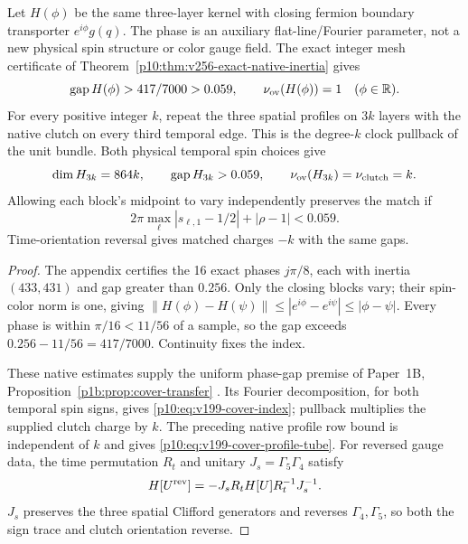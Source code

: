 \documentclass[12pt,a4paper]{article}
\begin{document}
\begin{theorem}
\label{p10:thm:v199-native-clock-covers}
Let \(H(\phi)\) be the same three-layer kernel with closing fermion boundary
transporter \(e^{i\phi}g(q)\).  The phase is an auxiliary flat-line/Fourier
parameter, not a new physical spin structure or color gauge field. The exact
integer mesh certificate of Theorem~\ref{p10:thm:v256-exact-native-inertia} gives
\begin{equation}
 \operatorname{gap}H(\phi)>417/7000>0.059,\qquad
 \nu_{\rm ov}(H(\phi))=1\quad(\phi\in\mathbb R).
 \label{p10:eq:v199-uniform-twist-gap}
\end{equation}
For every positive integer \(k\), repeat the three spatial profiles on
\(3k\) layers with the native clutch on every third temporal edge.  This is
the degree-\(k\) clock pullback of the unit bundle.  Both physical temporal
spin choices give
\begin{equation}
 \dim H_{3k}=864k,\qquad \operatorname{gap}H_{3k}>0.059,\qquad
 \nu_{\rm ov}(H_{3k})=\nu_{\rm clutch}=k.
 \label{p10:eq:v199-cover-index}
\end{equation}
Allowing each block's midpoint to vary independently preserves the match if
\begin{equation}
 2\pi\max_\ell|s_{\ell,1}-1/2|+|\rho-1|<0.059.
 \label{p10:eq:v199-cover-profile-tube}
\end{equation}
Time-orientation reversal gives matched charges \(-k\) with the same gaps.
\end{theorem}
\begin{proof}
The appendix certifies the 16 exact phases $j\pi/8$, each with inertia
$(433,431)$ and gap greater than $0.256$. Only the closing blocks
vary; their spin-color norm is one, giving
$\|H(\phi)-H(\psi)\|\le|e^{i\phi}-e^{i\psi}|\le|\phi-\psi|$.
Every phase is within $\pi/16<11/56$ of a sample, so the gap exceeds
$0.256-11/56=417/7000$. Continuity fixes the index.

These native estimates supply the uniform phase-gap premise of
Paper~1B, Proposition~\ref{p1b:prop:cover-transfer}
\cite{Kugelmann2026Paper1B}. Its Fourier decomposition, for both
temporal spin signs, gives \eqref{p10:eq:v199-cover-index}; pullback
multiplies the supplied clutch charge by $k$. The preceding native
profile row bound is independent of $k$ and gives
\eqref{p10:eq:v199-cover-profile-tube}.
For reversed gauge data, the time permutation $R_t$ and unitary
$J_s=\Gamma_5\Gamma_4$ satisfy
\[
 H[U^{\rm rev}]=-J_sR_tH[U]R_t^{-1}J_s^{-1}.
\]
$J_s$ preserves the three spatial Clifford generators and reverses
$\Gamma_4,\Gamma_5$, so both the sign trace and clutch orientation reverse.
\end{proof}
\end{document}
